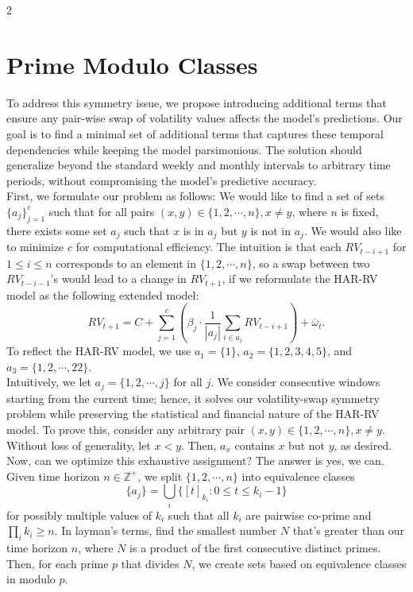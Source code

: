 \documentclass[a4paper]{article}
\begin{document}
\begin{multicols}{2}
\section{Prime Modulo Classes}
\noindent To address this symmetry issue, we propose introducing additional terms that ensure any pair-wise swap of volatility values affects the model's predictions. Our goal is to find a minimal set of additional terms that captures these temporal dependencies while keeping the model parsimonious. The solution should generalize beyond the standard weekly and monthly intervals to arbitrary time periods, without compromising the model's predictive accuracy.
\vspace{0.3cm}
\\ First, we formulate our problem as follows: We would like to find a set of sets $\{a_j\}_{j=1}^c$ such that for all pairs $(x, y) \in \{1, 2, \cdots, n\}, x \neq y$, where $n$ is fixed, there exists some set $a_j$ such that $x$ is in $a_j$ but $y$ is not in $a_j$. We would also like to minimize $c$ for computational efficiency. The intuition is that each $RV_{t-i+1}$ for $1 \leq i \leq n$ corresponds to an element in $\{1, 2, \cdots, n\}$, so a swap between two $RV_{t-i-1}$'s would lead to a change in $RV_{t+1}$, if we reformulate the HAR-RV model as the following extended model: $$RV_{t+1} = C + \sum_{j = 1}^c\left(\beta_j \cdot \frac{1}{|a_j|} \sum_{i \in a_j} RV_{t-i+1}\right) + \overline{\omega}_t.$$ To reflect the HAR-RV model, we use $a_1 = \{1\}$, $a_2 = \{1, 2, 3, 4, 5\}$, and $a_3 = \{1, 2, \cdots, 22\}$.
\vspace{0.3cm}
\\ Intuitively, we let $a_j = \{1, 2, \cdots, j\}$ for all $j$. We consider consecutive windows starting from the current time; hence, it solves our volatility-swap symmetry problem while preserving the statistical and financial nature of the HAR-RV model. To prove this, consider any arbitrary pair $(x, y) \in \{1, 2, \cdots, n\}, x \neq y$. Without loss of generality, let $x<y$. Then, $a_x$ contains $x$ but not $y$, as desired. Now, can we optimize this exhaustive assignment? The answer is yes, we can.
\vspace{0.3cm}
\\ Given time horizon $n\in \mathbb{Z}^+$, we split $\{1, 2, \cdots, n\}$ into equivalence classes $$\{a_j\} = \bigcup_{i} \{[t]_{k_i}: 0 \leq t \leq k_i-1\}$$ for possibly multiple values of $k_i$ such that all $k_i$ are pairwise co-prime and $\displaystyle\prod_i k_i \geq n$.  In layman's terms, find the smallest number $N$ that's greater than our time horizon $n$, where $N$ is a product of the first consecutive distinct primes. Then, for each prime $p$ that divides $N$, we create sets based on equivalence classes in modulo $p$.

\end{multicols}
\end{document}
